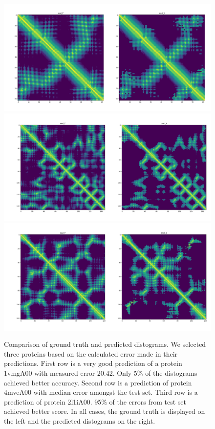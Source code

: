 \begin{figure}
    \centering
    \includegraphics[width=0.75\linewidth]{imgs_andy/distograms/test_vis_sim_5perc_1vmgA00_20.42.png}
    \includegraphics[width=0.75\linewidth]{imgs_andy/distograms/test_vis_sim_median_4mveA00_28.69.png}
    \includegraphics[width=0.75\linewidth]{imgs_andy/distograms/test_vis_sim_95perc_2l1iA00_39.11.png}
    \caption{Comparison of ground truth and predicted distograms. We selected three proteins based on the calculated error made in their predictions. First row is a very good prediction of a protein 1vmgA00 with measured error 20.42. Only 5\% of the distograms achieved better accuracy. Second row is a prediction of protein 4mveA00 with median error amongst the test set. Third row is a prediction of protein 2l1iA00. 95\% of the errors from test set achieved better score. In all cases, the ground truth is displayed on the left and the predicted distograms on the right.}
    \label{fig:distograms}
\end{figure}

